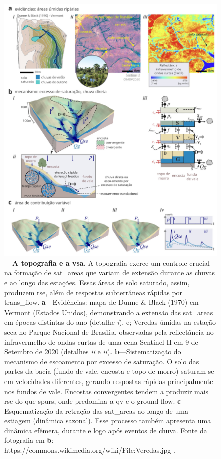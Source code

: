\documentclass[./main.tex]{subfiles}
\begin{document}
\begin{figure}[t!] 
\centering				
\includegraphics[width=0.98\linewidth]{figs/fig_topo.jpg}		
\caption[A topografia e a área de contribuição variável]
{\textbf{---\;A topografia e a \gls{vsa}.}
    A topografia exerce um controle crucial na formação de \gls{sat_areas} que variam de extensão durante as chuvas e ao longo das estações. Essas áreas de solo saturado, assim, produzem \gls{rse}, além de respostas subterrâneas rápidas por \gls{trans_flow}.
    \;\textbf{a}\;---\;Evidências: mapa de Dunne \& Black (1970) em Vermont (Estados Unidos), demonstrando a extensão das \gls{sat_areas} em épocas distintas do ano (detalhe \textrm{\textit{i}}), e; Veredas úmidas na estação seca no Parque Nacional de Brasília, observadas pela reflectância no infravermelho de ondas curtas de uma cena Sentinel-II em 9 de Setembro de 2020 (detalhes \textrm{\textit{ii}} e \textrm{\textit{ii}}). 
    \;\textbf{b}\;---\;Sistematização do mecanismo de escoamento por excesso de saturação. O solo das partes da bacia (fundo de vale, encosta e topo de morro) saturam-se em velocidades diferentes, gerando respostas rápidas principalmente nos fundos de vale. Encostas convergentes tendem a produzir mais \gls{rse} do que \gls{spurs}, onde predomina a \gls{qv} e o \gls{ground-flow}.
    \;\textbf{c}\;---\;Esquematização da retração das \gls{sat_areas} ao longo de uma estiagem (dinâmica sazonal). Esse processo também apresenta uma dinâmica efêmera, durante e logo após eventos de chuva. Fonte da fotografia em \textbf{b}: https://commons.wikimedia.org/wiki/File:Veredas.jpg .
}
\label{fig:hydro:topo} 		
\end{figure}
\end{document}
